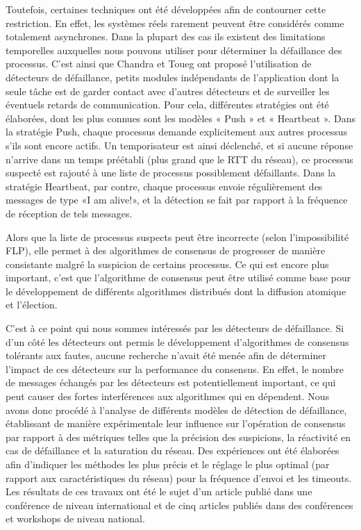 \documentclass[a4paper]{book}
\begin{document}
Toutefois, certaines techniques ont été développées afin de contourner cette restriction. En effet, les systèmes réels rarement peuvent être considérés comme totalement asynchrones. Dans la plupart des cas ils existent des limitations temporelles auxquelles nous pouvons utiliser pour déterminer la défaillance des processus. C'est ainsi que Chandra et Toueg ont proposé l'utilisation de détecteurs de défaillance, petits modules indépendants de l'application dont la seule tâche est de garder contact avec d'autres détecteurs et de surveiller les éventuels retards de communication. Pour cela, différentes stratégies ont été élaborées, dont les plus connues sont les modèles « Push » et « Heartbeat ». Dans la stratégie Push, chaque processus demande explicitement aux autres processus s'ils sont encore actifs. Un temporisateur est ainsi déclenché, et si aucune réponse n'arrive dans un temps préétabli (plus grand que le RTT du réseau), ce processus suspecté est rajouté à une liste de processus possiblement défaillants. Dans la stratégie Heartbeat, par contre, chaque processus envoie régulièrement des messages de type «I am alive!», et la détection se fait par rapport à la fréquence de réception de tels messages.

Alors que la liste de processus suspects peut être incorrecte (selon l'impossibilité FLP), elle permet à des algorithmes de consensus de progresser de manière consistante malgré la suspicion de certains processus. Ce qui est encore plus important, c'est que l'algorithme de consensus peut être utilisé comme base pour le développement de différents algorithmes distribués dont la diffusion atomique et l'élection.

C'est à ce point qui nous sommes intéressés par les détecteurs de défaillance. Si d'un côté les détecteurs ont permis le développement d'algorithmes de consensus tolérants aux fautes, aucune recherche n'avait été menée afin de déterminer l'impact de ces détecteurs sur la performance du consensus. En effet, le nombre de messages échangés par les détecteurs est potentiellement important, ce qui peut causer des fortes interférences aux algorithmes qui en dépendent. Nous avons donc procédé à l'analyse de différents modèles de détection de défaillance, établissant de manière expérimentale leur influence sur l'opération de consensus par rapport à des métriques telles que la précision des suspicions, la réactivité en cas de défaillance et la saturation du réseau. Des expériences ont été élaborées afin d'indiquer les méthodes les plus précis et le réglage le plus optimal (par rapport aux caractéristiques du réseau) pour la fréquence d'envoi et les timeouts.
Les résultats de ces travaux ont été le sujet d'un article publié dans une conférence de niveau international et de cinq articles publiés dans des conférences et workshops de niveau national.
\end{document}

